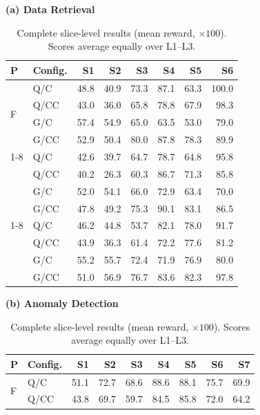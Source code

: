 \begin{table}[t]
\centering
\caption{Complete slice-level results (mean reward, $\times 100$).
Scores average equally over L1--L3.}
\label{tab:app-slice-results}
\small
\setlength{\tabcolsep}{1.5pt}
\renewcommand{\arraystretch}{1.08}
\begin{minipage}[t]{0.49\textwidth}
\centering
\textbf{(a) Data Retrieval}\par\vspace{3pt}
\begin{tabular*}{\linewidth}{@{\extracolsep{\fill}}ll*{6}{r}@{}}
\toprule
P & Config. & S1 & S2 & S3 & S4 & S5 & S6 \\
\midrule
\multirow{4}{*}{F} & Q/C & 48.8 & 40.9 & 73.3 & 87.1 & 63.3 & 100.0 \\
 & Q/CC & 43.0 & 36.0 & 65.8 & 78.8 & 67.9 & 98.3 \\
 & G/C & 57.4 & 54.9 & 65.0 & 63.5 & 53.0 & 79.0 \\
 & G/CC & 52.9 & 50.4 & 80.0 & 87.8 & 78.3 & 89.9 \\
\cmidrule(lr){1-8}
\multirow{4}{*}{N} & Q/C & 42.6 & 39.7 & 64.7 & 78.7 & 64.8 & 95.8 \\
 & Q/CC & 40.2 & 26.3 & 60.3 & 86.7 & 71.3 & 85.8 \\
 & G/C & 52.0 & 54.1 & 66.0 & 72.9 & 63.4 & 70.0 \\
 & G/CC & 47.8 & 49.2 & 75.3 & 90.1 & 83.1 & 86.5 \\
\cmidrule(lr){1-8}
\multirow{4}{*}{S} & Q/C & 46.2 & 44.8 & 53.7 & 82.1 & 78.0 & 91.7 \\
 & Q/CC & 43.9 & 36.3 & 61.4 & 72.2 & 77.6 & 81.2 \\
 & G/C & 55.2 & 55.7 & 72.4 & 71.9 & 76.9 & 80.0 \\
 & G/CC & 51.0 & 56.9 & 76.7 & 83.6 & 82.3 & 97.8 \\
\bottomrule
\end{tabular*}
\end{minipage}\hfill
\begin{minipage}[t]{0.49\textwidth}
\centering
\textbf{(b) Anomaly Detection}\par\vspace{3pt}
\begin{tabular*}{\linewidth}{@{\extracolsep{\fill}}ll*{7}{r}@{}}
\toprule
P & Config. & S1 & S2 & S3 & S4 & S5 & S6 & S7 \\
\midrule
\multirow{4}{*}{F} & Q/C & 51.1 & 72.7 & 68.6 & 88.6 & 88.1 & 75.7 & 69.9 \\
 & Q/CC & 43.8 & 69.7 & 59.7 & 84.5 & 85.8 & 72.0 & 64.2 \\

\end{tabular*}
\end{minipage}
\end{table}
